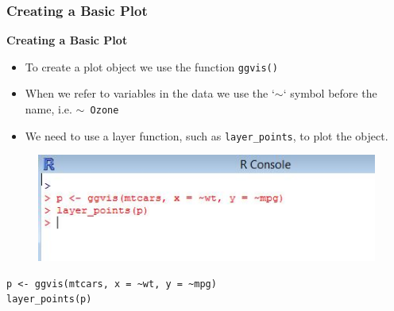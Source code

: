 \documentclass[MASTER.tex]{subfiles}
\begin{document}
 
	

\begin{frame}
	\frametitle{Creating a Basic Plot}
	\vspace{-1cm}
	\Large
	\textbf{Creating a Basic Plot}
	\begin{itemize}
		\item To create a plot object we use the function \texttt{ggvis()}
		\item When we refer to variables in the data we use the
		`$\sim$` symbol before the name, i.e. \texttt{$\sim$ \texttt{Ozone}}
		\item We need to use a layer function, such as
		\texttt{layer\_points}, to plot the object.
	\end{itemize}
	
\end{frame}
\begin{frame}[fragile]
	\begin{figure}
\centering
\includegraphics[width=0.99\linewidth]{images/basicscipt1}

\end{figure}
\Large
\begin{framed}
\begin{verbatim}
p <- ggvis(mtcars, x = ~wt, y = ~mpg)
layer_points(p)
\end{verbatim}
\end{framed}
\end{frame}
\end{document}
